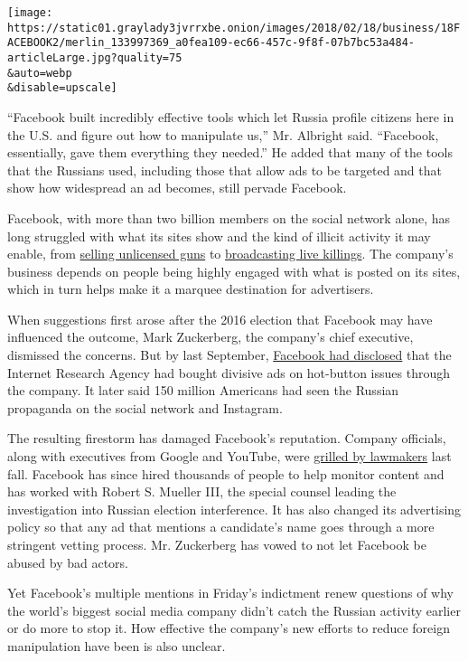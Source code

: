 \texttt{[image: https://static01.graylady3jvrrxbe.onion/images/2018/02/18/business/18FACEBOOK2/merlin\_133997369\_a0fea109-ec66-457c-9f8f-07b7bc53a484-articleLarge.jpg?quality=75\\\&auto=webp\\\&disable=upscale]}

``Facebook built incredibly effective tools which let Russia profile
citizens here in the U.S. and figure out how to manipulate us,'' Mr.
Albright said. ``Facebook, essentially, gave them everything they
needed.'' He added that many of the tools that the Russians used,
including those that allow ads to be targeted and that show how
widespread an ad becomes, still pervade Facebook.

Facebook, with more than two billion members on the social network
alone, has long struggled with what its sites show and the kind of
illicit activity it may enable, from
\href{https://www.nytimes3xbfgragh.onion/2016/01/30/technology/facebook-gun-sales-ban.html}{selling
unlicensed guns} to
\href{https://www.nytimes3xbfgragh.onion/2017/04/25/world/asia/thailand-phuket-facebook-killing-daughter.html}{broadcasting
live killings}. The company's business depends on people being highly
engaged with what is posted on its sites, which in turn helps make it a
marquee destination for advertisers.

When suggestions first arose after the 2016 election that Facebook may
have influenced the outcome, Mark Zuckerberg, the company's chief
executive, dismissed the concerns. But by last September,
\href{https://www.nytimes3xbfgragh.onion/2017/09/06/technology/facebook-russian-political-ads.html}{Facebook
had disclosed} that the Internet Research Agency had bought divisive ads
on hot-button issues through the company. It later said 150 million
Americans had seen the Russian propaganda on the social network and
Instagram.

The resulting firestorm has damaged Facebook's reputation. Company
officials, along with executives from Google and YouTube, were
\href{https://www.nytimes3xbfgragh.onion/2017/10/31/us/politics/facebook-twitter-google-hearings-congress.html}{grilled
by lawmakers} last fall. Facebook has since hired thousands of people to
help monitor content and has worked with Robert S. Mueller III, the
special counsel leading the investigation into Russian election
interference. It has also changed its advertising policy so that any ad
that mentions a candidate's name goes through a more stringent vetting
process. Mr. Zuckerberg has vowed to not let Facebook be abused by bad
actors.

Yet Facebook's multiple mentions in Friday's indictment renew questions
of why the world's biggest social media company didn't catch the Russian
activity earlier or do more to stop it. How effective the company's new
efforts to reduce foreign manipulation have been is also unclear.

